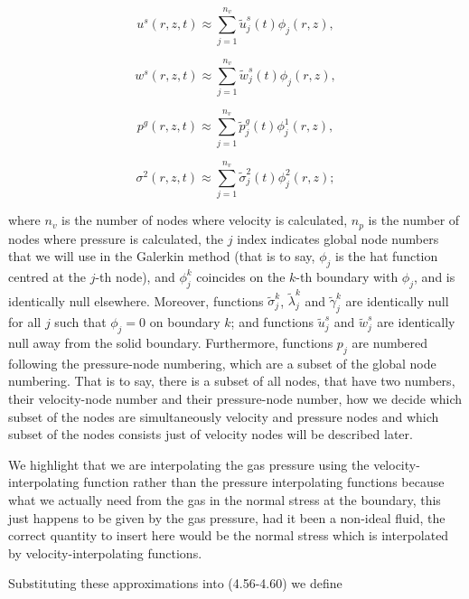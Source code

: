 \documentclass{article}
\begin{document}
\begin{equation}
u^s(r,z,t) \approx \sum_{j=1}^{n_v} \tilde{u}_j^s(t) \phi_j(r,z), \tag{4.77}
\end{equation}

\begin{equation}
w^s(r,z,t) \approx \sum_{j=1}^{n_v} \tilde{w}_j^s(t) \phi_j(r,z), \tag{4.78}
\end{equation}

\begin{equation}
p^g(r,z,t) \approx \sum_{j=1}^{n_v} \tilde{p}_j^g(t) \phi_j^1(r,z), \tag{4.79}
\end{equation}

\begin{equation}
\sigma^2(r,z,t) \approx \sum_{j=1}^{n_v} \tilde{\sigma}_j^2(t) \phi_j^2(r,z); \tag{4.80}
\end{equation}

where \(n_v\) is the number of nodes where velocity is calculated, \(n_p\) is the number of nodes where pressure is calculated, the \(j\) index indicates global node numbers that we will use in the Galerkin method (that is to say, \(\phi_j\) is the hat function centred at the \(j\)-th node), and \(\phi_j^k\) coincides on the \(k\)-th boundary with \(\phi_j\), and is identically null elsewhere. Moreover, functions \(\tilde{\sigma}_j^k\), \(\tilde{\lambda}_j^k\) and \(\tilde{\gamma}_j^k\) are identically null for all \(j\) such that \(\phi_j = 0\) on boundary \(k\); and functions \(\tilde{u}_j^s\) and \(\tilde{w}_j^s\) are identically null away from the solid boundary. Furthermore, functions \(p_j\) are numbered following the pressure-node numbering, which are a subset of the global node numbering. That is to say, there is a subset of all nodes, that have two numbers, their velocity-node number and their pressure-node number, how we decide which subset of the nodes are simultaneously velocity and pressure nodes and which subset of the nodes consists just of velocity nodes will be described later.

We highlight that we are interpolating the gas pressure using the velocity-interpolating function rather than the pressure interpolating functions because what we actually need from the gas in the normal stress at the boundary, this just happens to be given by the gas pressure, had it been a non-ideal fluid, the correct quantity to insert here would be the normal stress which is interpolated by velocity-interpolating functions.

Substituting these approximations into (4.56-4.60) we define
\end{document}
